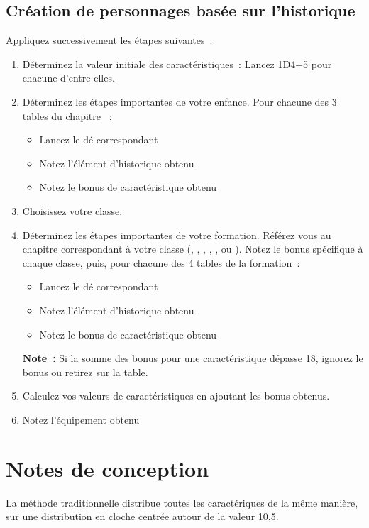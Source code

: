 \subsection{Création de personnages basée sur l'historique}
Appliquez successivement les étapes suivantes~:
\begin{enumerate}
  \item Déterminez la valeur initiale des caractéristiques~:
        Lancez 1D4+5 pour chacune d'entre elles.
  \item Déterminez les étapes importantes de votre enfance.
        Pour chacune des 3 tables du chapitre ~:
        \begin{itemize}
          \item Lancez le dé correspondant
          \item Notez l'élément d'historique obtenu
          \item Notez le bonus de caractéristique obtenu
        \end{itemize}
  \item Choisissez votre classe.
  \item Déterminez les étapes importantes de votre formation.
        Référez vous au chapitre correspondant à votre classe (, , , , ,  ou ).
        Notez le bonus spécifique à chaque classe, puis,
        pour chacune des 4 tables de la formation~:
        \begin{itemize}
          \item Lancez le dé correspondant
          \item Notez l'élément d'historique obtenu
          \item Notez le bonus de caractéristique obtenu
        \end{itemize}
        \textbf{Note~:} Si la somme des bonus pour une caractéristique dépasse 18, ignorez le bonus ou retirez sur la table.
  \item Calculez vos valeurs de caractéristiques en ajoutant les bonus obtenus.
  \item Notez l'équipement obtenu
\end{enumerate}

\ifmulticolEnd
\section*{Notes de conception}
La méthode traditionnelle distribue toutes les caractériques de la même manière, sur une distribution en cloche centrée autour de la valeur 10,5.

